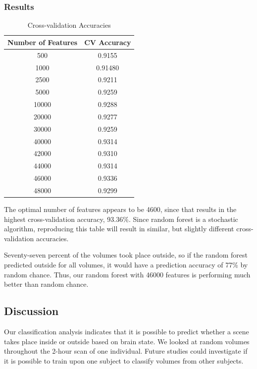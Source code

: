 \documentclass[11pt]{article}
\begin{document}
\subsubsection{Results}

\begin{table}[H]
  \centering
  \caption{Cross-validation Accuracies}
  \label{tab:table3}
  \begin{tabular}{cc}
    Number of Features & CV Accuracy\\
    \hline
    500 & 0.9155\\
    \hline
    1000 & 0.91480\\
    \hline
    2500 & 0.9211\\
    \hline
    5000 & 0.9259\\
    \hline
    10000 & 0.9288\\
    \hline
    20000 & 0.9277\\
    \hline
    30000 & 0.9259\\
    \hline
    40000 & 0.9314\\
    \hline
    42000 & 0.9310\\
    \hline
    44000 & 0.9314\\
    \hline
    46000 & 0.9336\\
    \hline
    48000 & 0.9299
  \end{tabular}
\end{table}

The optimal number of features appears to be 4600, since that results in the 
highest cross-validation accuracy, 93.36\%.  Since random forest is a stochastic 
algorithm, reproducing this table will result in similar, but slightly different
cross-validation accuracies.

Seventy-seven percent of the volumes took place outside, so if the random forest
predicted outside for all volumes, it would have a prediction accuracy of 77\%
by random chance.  Thus, our random forest with 46000 features is performing much
better than random chance.

\subsection{Discussion}
Our classification analysis indicates that it is possible to predict whether a 
scene takes place inside or outside based on brain state.  We looked at random volumes throughout the 2-hour scan of one individual.  Future studies could investigate if it is possible to train upon one subject 
to classify volumes from other subjects.
\end{document}
